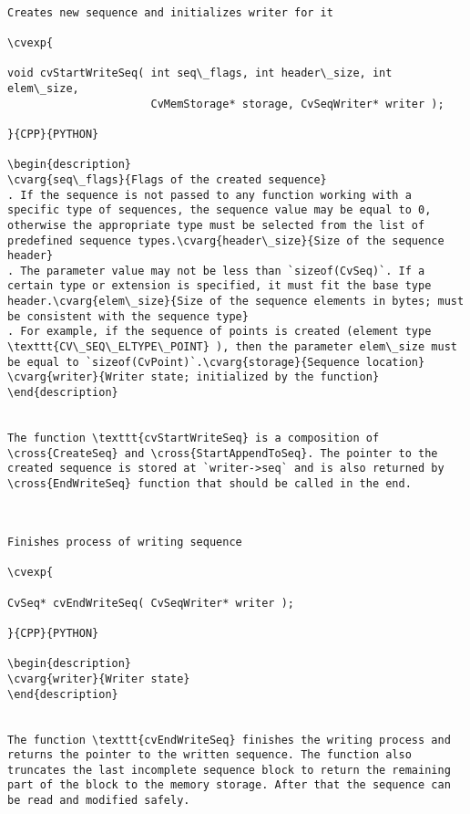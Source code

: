 \begin{verbatim}

Creates new sequence and initializes writer for it

\cvexp{

void cvStartWriteSeq( int seq\_flags, int header\_size, int elem\_size,
                      CvMemStorage* storage, CvSeqWriter* writer );

}{CPP}{PYTHON}

\begin{description}
\cvarg{seq\_flags}{Flags of the created sequence}
. If the sequence is not passed to any function working with a specific type of sequences, the sequence value may be equal to 0, otherwise the appropriate type must be selected from the list of predefined sequence types.\cvarg{header\_size}{Size of the sequence header}
. The parameter value may not be less than `sizeof(CvSeq)`. If a certain type or extension is specified, it must fit the base type header.\cvarg{elem\_size}{Size of the sequence elements in bytes; must be consistent with the sequence type}
. For example, if the sequence of points is created (element type \texttt{CV\_SEQ\_ELTYPE\_POINT} ), then the parameter elem\_size must be equal to `sizeof(CvPoint)`.\cvarg{storage}{Sequence location}
\cvarg{writer}{Writer state; initialized by the function}
\end{description}


The function \texttt{cvStartWriteSeq} is a composition of \cross{CreateSeq} and \cross{StartAppendToSeq}. The pointer to the created sequence is stored at `writer->seq` and is also returned by \cross{EndWriteSeq} function that should be called in the end.


\end{verbatim}
\begin{verbatim}

Finishes process of writing sequence

\cvexp{

CvSeq* cvEndWriteSeq( CvSeqWriter* writer );

}{CPP}{PYTHON}

\begin{description}
\cvarg{writer}{Writer state}
\end{description}


The function \texttt{cvEndWriteSeq} finishes the writing process and returns the pointer to the written sequence. The function also truncates the last incomplete sequence block to return the remaining part of the block to the memory storage. After that the sequence can be read and modified safely.


\end{verbatim}
